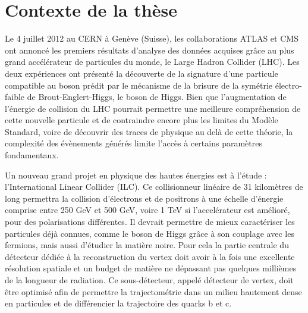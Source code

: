 \documentclass[a4papper, 10pt]{article}
\title{\textbf{Intelligent detection layers for advanced tracking in high-energy physics} \\ \large \vskip 1ex
        Résumé de la thèse de doctorat}
\author{Benjamin Boitrelle \\ 
        Sous la direction de : \\
        Jérôme Baudot : Directeur de thèse à l'Université de Strasbourg \\
        Ingrid Maria Gregor : Encadrante au laboratoire d'accueil au DESY de Hambourg}
\date{}
\begin{document}
    \maketitle


  \section{Contexte de la thèse}

  Le 4 juillet 2012 au CERN à Genève (Suisse), les collaborations ATLAS et CMS ont annoncé les premiers résultats d'analyse des données acquises grâce au plus grand accélérateur de particules du monde, le Large Hadron Collider (LHC). 
  Les deux expériences ont présenté la découverte de la signature d'une particule compatible au boson prédit par le mécanisme de la brisure de la symétrie électro-faible de Brout-Englert-Higgs, le boson de Higgs.
  Bien que l'augmentation de l'énergie de collision du LHC pourrait permettre une meilleure compréhension de cette nouvelle particule et de contraindre encore plus les limites du Modèle Standard, voire de découvrir des traces de physique au delà de cette théorie, la complexité des évènements générés limite l'accès à certains paramètres fondamentaux.

  Un nouveau grand projet en physique des hautes énergies est à l'étude : l'International Linear Collider (ILC). 
  Ce collisionneur linéaire de 31 kilomètres de long permettra la collision d'électrons et de positrons à une échelle d'énergie comprise entre 250 GeV et 500 GeV, voire 1 TeV si l'accelérateur est amélioré, pour des polarisations différentes.
  Il devrait permettre de mieux caractériser les particules déjà connues, comme le boson de Higgs grâce à son couplage avec les fermions, mais aussi d'étudier la matière noire. 
  Pour cela la partie centrale du détecteur dédiée à la reconstruction du vertex doit avoir à la fois une excellente résolution spatiale et un budget de matière ne dépassant pas quelques millièmes de la longueur de radiation. 
  Ce sous-détecteur, appelé détecteur de vertex, doit être optimisé afin de permettre la trajectométrie dans un milieu hautement dense en particules et de différencier la trajectoire des quarks b et c.
\end{document}
